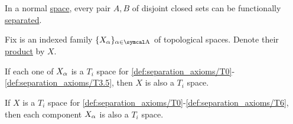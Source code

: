 \begin{lemma}\label{thm:urysohns_lemma}\cite[1.5.11]{Engelking1989}
  In a normal \hyperref[def:separation_axioms/T4]{space}, every pair \( A, B \) of disjoint closed sets can be functionally \hyperref[def:topological_space_separation]{separated}.
\end{lemma}

\begin{theorem}\label{thm:separation_axioms_of_product}
  Fix is an indexed family \( \{ X_\al \}_{\al \in \CA} \) of topological spaces. Denote their \hyperref[def:topological_product]{product} by \( X \).

  \begin{thmenum}
    \cite[theorem 2.3.11]{Engelking1989} If each one of \( X_\alpha \) is a \( T_i \) space for \ref{def:separation_axioms/T0}-\ref{def:separation_axioms/T3.5}, then \( X \) is also a \( T_i \) space.

    \cite[theorem 2.3.11]{Engelking1989} If \( X \) is a \( T_i \) space for \ref{def:separation_axioms/T0}-\ref{def:separation_axioms/T6}, then each component \( X_\alpha \) is also a \( T_i \) space.
  \end{thmenum}
\end{theorem}
